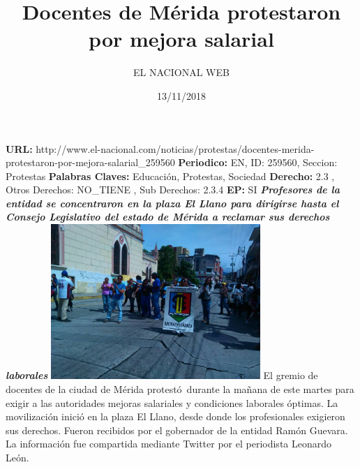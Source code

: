 \documentclass{article}%
\title{\textbf{Docentes de Mérida protestaron por mejora salarial}}%
\author{EL NACIONAL WEB}%
\date{13/11/2018}%
\begin{document}
%
\normalsize%
\maketitle%
\textbf{URL: }%
http://www.el{-}nacional.com/noticias/protestas/docentes{-}merida{-}protestaron{-}por{-}mejora{-}salarial\_259560\newline%
%
\textbf{Periodico: }%
EN, %
ID: %
259560, %
Seccion: %
Protestas\newline%
%
\textbf{Palabras Claves: }%
Educación, Protestas, Sociedad\newline%
%
\textbf{Derecho: }%
2.3%
, Otros Derechos: %
NO\_TIENE%
, Sub Derechos: %
2.3.4%
\newline%
%
\textbf{EP: }%
SI\newline%
\newline%
%
\textbf{\textit{Profesores de la entidad se concentraron en la plaza El Llano para dirigirse hasta el Consejo Legislativo del estado de Mérida a reclamar sus derechos laborales}}%
\newline%
\newline%
%
\includegraphics[width=300px]{95.jpg}%
\newline%
%
El gremio de docentes de la ciudad de Mérida protestó~durante la mañana de este martes para exigir a las autoridades mejoras salariales y condiciones laborales óptimas.%
\newline%
%
La movilización inició en la plaza El Llano, desde donde los profesionales exigieron sus derechos. Fueron recibidos por el gobernador de la entidad Ramón Guevara.%
\newline%
%
La información fue compartida mediante Twitter por el periodista Leonardo León.%
\newline%
%
\end{document}

